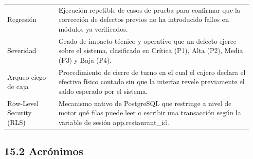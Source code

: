 \documentclass[10pt,a4paper]{article}
\begin{document}
{\begin{longtable}[]{@{}
  >{\raggedright\arraybackslash}p{}
  >{\raggedright\arraybackslash}p{}@{}}
Regresión & Ejecución repetible de casos de prueba para confirmar que la corrección de defectos previos no ha introducido fallos en módulos ya verificados. \\
Severidad & Grado de impacto técnico y operativo que un defecto ejerce sobre el sistema, clasificado en Crítica (P1), Alta (P2), Media (P3) y Baja (P4). \\
Arqueo ciego de caja & Procedimiento de cierre de turno en el cual el cajero declara el efectivo físico contado sin que la interfaz revele previamente el saldo esperado por el sistema. \\
Row-Level Security (RLS) & Mecanismo nativo de PostgreSQL que restringe a nivel de motor qué filas puede leer o escribir una transacción según la variable de sesión app.restaurant\_id. \\
\end{longtable}
}

\endgroup\medskip


\subsection{15.2 Acrónimos}\label{152-acruxf3nimos}

\begingroup\singlespacing\footnotesize\setlength{\parskip}{0pt}
\end{document}
